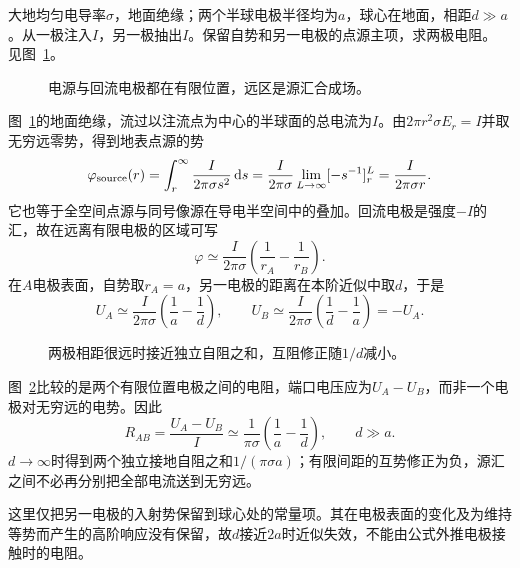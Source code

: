 \begin{example}[两个半球电极之间的互阻]\label{ex:c1-pair-earth}
大地均匀电导率$\sigma$，地面绝缘；两个半球电极半径均为$a$，球心在地面，相距$d\gg a$。从一极注入$I$，另一极抽出$I$。保留自势和另一电极的点源主项，求两极电阻。 见图~\ref{fig:c1-pair-earth-q}。
\end{example}

\begin{figure}[H]\centering
{}
\caption{电源与回流电极都在有限位置，远区是源汇合成场。}\label{fig:c1-pair-earth-q}
\end{figure}
\begin{solution}
图~\ref{fig:c1-pair-earth-q}的地面绝缘，流过以注流点为中心的半球面的总电流为$I$。由$2\pi r^2\sigma E_r=I$并取无穷远零势，得到地表点源的势
\[
 \varphi_{\rm source}(r)=\int_r^\infty\frac{I}{2\pi\sigma s^2}\mathop{}\!\mathrm d s
 =\frac{I}{2\pi\sigma}\lim_{L\to\infty}[-s^{-1}]_r^L
 =\frac{I}{2\pi\sigma r}.
\]
它也等于全空间点源与同号像源在导电半空间中的叠加。回流电极是强度$-I$的汇，故在远离有限电极的区域可写
\[
 \varphi\simeq\frac{I}{2\pi\sigma}
 \left(\frac1{r_A}-\frac1{r_B}\right).
\]
在$A$电极表面，自势取$r_A=a$，另一电极的距离在本阶近似中取$d$，于是
\[
 U_A\simeq\frac{I}{2\pi\sigma}\left(\frac1a-\frac1d\right),\qquad
 U_B\simeq\frac{I}{2\pi\sigma}\left(\frac1d-\frac1a\right)=-U_A.
\]
\begin{figure}[H]\centering
{}
\caption{两极相距很远时接近独立自阻之和，互阻修正随$1/d$减小。}\label{fig:c1-pair-earth-s}
\end{figure}
图~\ref{fig:c1-pair-earth-s}比较的是两个有限位置电极之间的电阻，端口电压应为$U_A-U_B$，而非一个电极对无穷远的电势。因此
\[
 \boxed{R_{AB}=\frac{U_A-U_B}{I}
 \simeq\frac1{\pi\sigma}\left(\frac1a-\frac1d\right)},\qquad d\gg a.
\]
$d\to\infty$时得到两个独立接地自阻之和$1/(\pi\sigma a)$；有限间距的互势修正为负，源汇之间不必再分别把全部电流送到无穷远。

这里仅把另一电极的入射势保留到球心处的常量项。其在电极表面的变化及为维持等势而产生的高阶响应没有保留，故$d$接近$2a$时近似失效，不能由公式外推电极接触时的电阻。
\end{solution}

